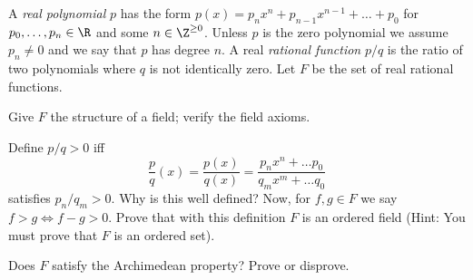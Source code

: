\documentclass{assignment}
\begin{document}
\begin{question}[2]
  A \emph{real polynomial} $p$ has the form $p(x) = p_nx^n + p_{n-1}x^{n-1} + \ldots + p_0$ for $p_0,
\ldots, p_n\in\R$ and some $n\in\Z^{\geq0}$. Unless $p$ is the zero polynomial we assume $p_n\neq 0$ 
and we say that $p$ has degree $n$. A real \emph{rational function} $p/q$ is the ratio of two polynomials
where $q$ is not identically zero. Let $F$ be the set of real rational functions. \\

\begin{qparts}
  \item Give $F$ the structure of a field; verify the field axioms.
  \item Define $p/q >0$ iff $$\frac{p}{q}(x) = \frac{p(x)}{q(x)} = \frac{p_nx^n + \ldots p_0}{q_mx^m
 + \ldots q_0}$$ satisfies $p_n/q_m > 0.$ Why is this well defined? Now, for $f,g\in F$ we say $f > g
\iff f- g > 0$. Prove that with this definition $F$ is an ordered field (Hint: You must prove that $F$
is an ordered set).
  \item Does $F$ satisfy the Archimedean property? Prove or disprove.
\end{qparts}
\end{question}
\end{document}
